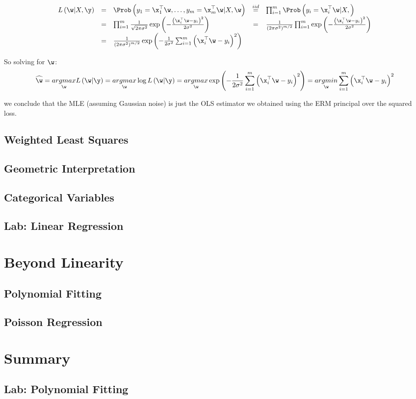 $$
\begin{array}{cclcl}
L\left(\w|X,\y\right) & = & \Prob\left(y_{1}=\x_{1}^{\top}\w,\ldots,y_{m}=\x_{m}^{\top}\w|X,\w\right) & \overset{iid}{=} & \prod_{i=1}^{m}\Prob\left(y_{i}=\x_{i}^{\top}\w|X,\right)\\
& = & \prod_{i=1}^{m}\frac{1}{\sqrt{2\pi\sigma^{2}}}\exp\left(-\frac{\left(\x_{i}^{\top}\w-y_{i}\right)^{2}}{2\sigma^{2}}\right) & = & \frac{1}{\left(2\pi\sigma^{2}\right)^{m/2}}\prod_{i=1}^{m}\exp\left(-\frac{\left(\x_{i}^{\top}\w-y_{i}\right)^{2}}{2\sigma^{2}}\right)\\
& = & \frac{1}{\left(2\pi\sigma^{2}\right)^{m/2}}\exp\left(-\frac{1}{2\sigma^{2}}\sum_{i=1}^{m}\left(\x_{i}^{\top}\w-y_{i}\right)^{2}\right)
\end{array}
$$

So solving for $\w$:
$$ \widehat{\w}=\underset{\w}{argmax}L\left(\w|\y\right)=\underset{\w}{argmax}\log L\left(\w|\y\right)=\underset{\w}{argmax}\exp\left(-\frac{1}{2\sigma^{2}}\sum_{i=1}^{m}\left(\x_{i}^{\top}\w-y_{i}\right)^{2}\right)=\underset{\w}{argmin}\sum_{i=1}^{m}\left(\x_{i}^{\top}\w-y_{i}\right)^{2}$$

we conclude that the MLE (assuming Gaussian noise) is just the OLS estimator we obtained using the ERM principal over the squared loss. %
\subsection{Weighted Least Squares}
\subsection{Geometric Interpretation}
\subsection{Categorical Variables}
\subsection{Lab: Linear Regression}

\section{Beyond Linearity}
\subsection{Polynomial Fitting}
\subsection{Poisson Regression}
\section{Summary}
\subsection{Lab: Polynomial Fitting}